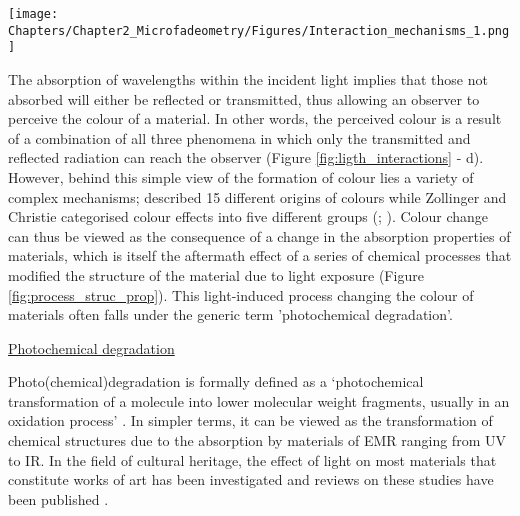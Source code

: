 \begin{figure*}
\centering
\texttt{[image: Chapters/Chapter2\_Microfadeometry/Figures/Interaction\_mechanisms\_1.png]}
\caption[\hspace{0.3cm}Interactions between radiation and objects]{Interactions between radiation and objects.}
\label{fig:ligth_interactions}
\end{figure*}


The absorption of wavelengths within the incident light implies that those not absorbed will either be reflected or transmitted, thus allowing an observer to perceive the colour of a material. In other words, the perceived colour is a result of a combination of all three phenomena in which only the transmitted and reflected radiation can reach the observer (Figure \ref{fig:ligth_interactions} - d). However, behind this simple view of the formation of colour lies a variety of complex mechanisms; \citet{nassau_physics_2003} described 15 different origins of colours while Zollinger and Christie categorised colour effects into five different groups (\citealp[50]{zollinger_color_2003}; \citealp[17]{christie_colour_2001}). Colour change can thus be viewed as the consequence of a change in the absorption properties of materials, which is itself the aftermath effect of a series of chemical processes that modified the structure of the material due to light exposure (Figure \ref{fig:process_struc_prop}). This light-induced process changing the colour of materials often falls under the generic term 'photochemical degradation'.




\underline{Photochemical degradation}

Photo(chemical)degradation is formally defined as a ‘photochemical transformation of a molecule into lower molecular weight fragments, usually in an oxidation process’ \citep[389]{braslavsky_glossary_2007}. In simpler terms, it can be viewed as the transformation of chemical structures due to the absorption by materials of \gls{EMR} ranging from \gls{UV} to \gls{IR}. In the field of cultural heritage, the effect of light on most materials that constitute works of art has been investigated and reviews on these studies have been published \citep{desai_photodegradation_1968, havermans_photo_1997, miliani_photochemistry_2018, romani_photochemistry_2011}.\\


